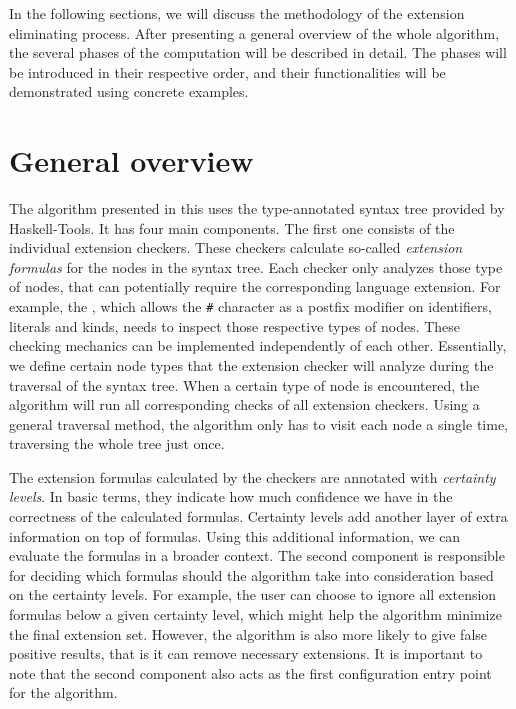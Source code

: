 \documentclass[main.tex]{subfiles}
\begin{document}
	
	
	In the following sections, we will discuss the methodology of the extension eliminating process. After presenting a general overview of the whole algorithm, the several phases of the computation will be described in detail. The phases will be introduced in their respective order, and their functionalities will be demonstrated using concrete examples.
	
	\section{General overview}
	
	The algorithm presented in this \paper{} uses the type-annotated syntax tree provided by Haskell-Tools. It has four main components. The first one consists of the individual extension checkers. These checkers calculate so-called \emph{extension formulas} for the nodes in the syntax tree. Each checker only analyzes those type of nodes, that can potentially require the corresponding language extension. For example, the , which allows the \texttt{\#} character as a postfix modifier on identifiers, literals and kinds, needs to inspect those respective types of nodes. These checking mechanics can be implemented independently of each other. Essentially, we define certain node types that the extension checker will analyze during the traversal of the syntax tree. When a certain type of node is encountered, the algorithm will run all corresponding checks of all extension checkers. Using a general traversal method, the algorithm only has to visit each node a single time, traversing the whole tree just once.
	
	The extension formulas calculated by the checkers are annotated with \emph{certainty levels}. In basic terms, they indicate how much confidence we have in the correctness of the calculated formulas. Certainty levels add another layer of extra information on top of formulas. Using this additional information, we can evaluate the formulas in a broader context. The second component is responsible for deciding which formulas should the algorithm take into consideration based on the certainty levels. For example, the user can choose to ignore all extension formulas below a given certainty level, which might help the algorithm minimize the final extension set. However, the algorithm is also more likely to give false positive results, that is it can remove necessary extensions. It is important to note that the second component also acts as the first configuration entry point for the algorithm.
	
\end{document}
